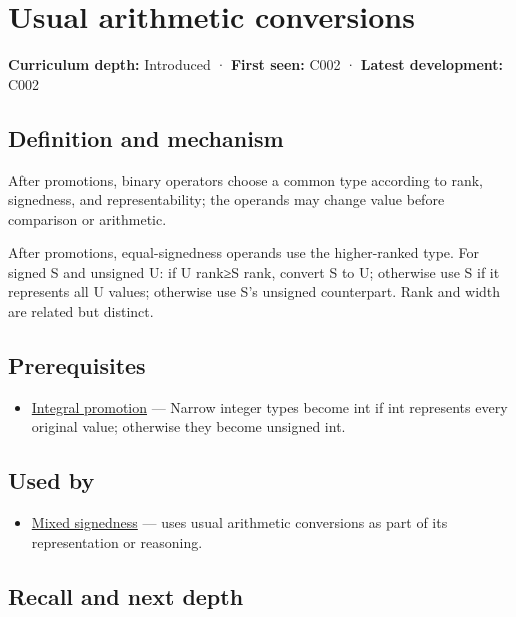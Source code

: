 \hypertarget{appendix-5e2d663adf7f}{}\label{referencestart:appendix-5e2d663adf7f}
\section{Usual arithmetic conversions}\label{appendix-5e2d663adf7f-usual-arithmetic-conversions}

\textbf{Curriculum depth:} Introduced · \textbf{First seen:} C002 · \textbf{Latest development:} C002

\subsection{Definition and mechanism}\label{appendix-5e2d663adf7f-definition-and-mechanism}

After promotions, binary operators choose a common type according to rank, signedness, and representability; the operands may change value before comparison or arithmetic.

After promotions, equal-signedness operands use the higher-ranked type. For signed S and unsigned U: if U rank≥S rank, convert S to U; otherwise use S if it represents all U values; otherwise use S's unsigned counterpart. Rank and width are related but distinct.

\subsection{Prerequisites}\label{appendix-5e2d663adf7f-prerequisites}

\begin{itemize}
\tightlist
\item
  \hyperref[appendix-45303d03796a]{Integral promotion} --- Narrow integer types become int if int represents every original value; otherwise they become unsigned int.
\end{itemize}

\subsection{Used by}\label{appendix-5e2d663adf7f-used-by}

\begin{itemize}
\tightlist
\item
  \hyperref[appendix-736a2345de4a]{Mixed signedness} --- uses usual arithmetic conversions as part of its representation or reasoning.
\end{itemize}

\subsection{Recall and next depth}\label{appendix-5e2d663adf7f-recall-and-next-depth}

